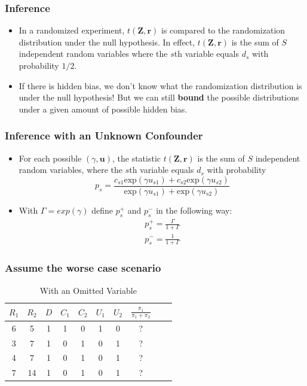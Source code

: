 \documentclass{beamer}
\begin{document}
  \begin{frame}
    \frametitle{Inference}
    \begin{itemize}
    \item In a randomized experiment, $t(\mathbf{Z},\mathbf{r})$ is
      compared to the randomization distribution under the null
      hypothesis. In effect, $t(\mathbf{Z},\mathbf{r})$ is the sum of
      $S$ independent random variables where the $s$th variable equals
      $d_s$ with probability $1/2$.
    \item If there is hidden bias, we don't know what the
      randomization distribution is under the null hypothesis! But we
      can still \textbf{bound} the possible distributions under a
      given amount of possible hidden bias.
\end{itemize}
  \end{frame}

\begin{frame}[c]\frametitle{Inference with an Unknown Confounder}
	\begin{itemize}
		\item<+-> For each possible $(\gamma, \mathbf{u})$, the statistic $t(\mathbf{Z,r})$ is the sum of $S$ independent random variables, where the $s$th variable equals $d_s$ with probability 
		\[
		p_s = \frac{c_{s1}\textrm{exp}(\gamma u_{s1}) + c_{s2}\textrm{exp}(\gamma u_{s2})}{\textrm{exp}(\gamma u_{s1}) + \textrm{exp}(\gamma u_{s2})}
		\]
		\item<+-> With $\Gamma = exp(\gamma)$ define $p^{+}_s$ and $p_s^-$ in the following way:
      \begin{eqnarray}
        \label{eq:1}
        p_s^+=\frac{\Gamma}{1+\Gamma} \\
        p_s^-=\frac{1}{1+\Gamma} 
     \end{eqnarray}

	\end{itemize}
\end{frame}

\begin{frame}[c]\frametitle{Assume the worse case scenario}
	\begin{table}
		\begin{center}
			\begin{tabular}{cccccccccc}
				$R_1$ & $R_2$ & $D$ & $C_1$ &$C_2$  & $U_1$ & $U_2$ & $\frac{\pi_1}{\pi_1 + \pi_2}$ \\ \hline
				6 & 5 & 1 & 1 & 0  & 1 & 0 &  ?\\
				3 & 7 & 1 & 0 & 1  & 0 & 1 & ?  \\
				4 & 7 & 1 & 0 & 1  & 0 & 1 &  ?\\
				7 & 14 & 1 & 0 & 1  & 0 & 1 & ? \\
			\end{tabular}
		\end{center}
		\caption{With an Omitted Variable}
	\end{table}
\end{frame}
\end{document}

